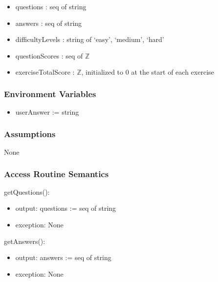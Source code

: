\documentclass[12pt, titlepage]{article}
\begin{document}
\begin{itemize}
    \item questions : seq of string %
    \item answers : seq of string %
    \item difficultyLevels :  string of `easy', `medium', `hard'
    \item questionScores : seq of $\mathbb{Z}$  %
    \item exerciseTotalScore : $\mathbb{Z}$, initialized to 0 at the start of each exercise %
\end{itemize}

\subsubsection{Environment Variables}

\begin{itemize}
    \item userAnswer := string %
\end{itemize}

\subsubsection{Assumptions}

None 

\subsubsection{Access Routine Semantics}

\noindent getQuestions():
\begin{itemize}
\item output: questions := seq of string
\item exception: None
\end{itemize}

\noindent getAnswers():
\begin{itemize}
\item output: answers := seq of string
\item exception: None
\end{itemize}
\end{document}
